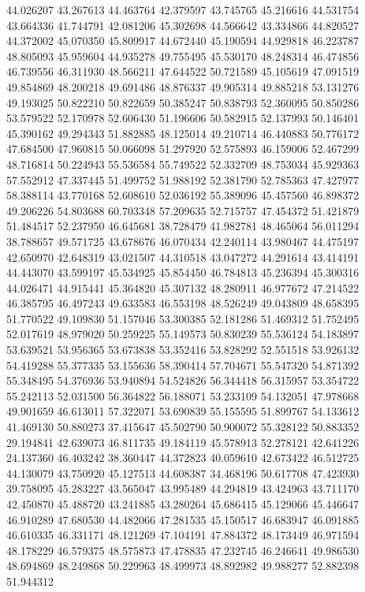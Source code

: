 44.026207
43.267613
44.463764
42.379597
43.745765
45.216616
44.531754
43.664336
41.744791
42.081206
45.302698
44.566642
43.334866
44.820527
44.372002
45.070350
45.809917
44.672440
45.190594
44.929818
46.223787
48.805093
45.959604
44.935278
49.755495
45.530170
48.248314
46.474856
46.739556
46.311930
48.566211
47.644522
50.721589
45.105619
47.091519
49.854869
48.200218
49.691486
48.876337
49.905314
49.885218
53.131276
49.193025
50.822210
50.822659
50.385247
50.838793
52.360095
50.850286
53.579522
52.170978
52.606430
51.196606
50.582915
52.137993
50.146401
45.390162
49.294343
51.882885
48.125014
49.210714
46.440883
50.776172
47.684500
47.960815
50.066098
51.297920
52.575893
46.159006
52.467299
48.716814
50.224943
55.536584
55.749522
52.332709
48.753034
45.929363
57.552912
47.337445
51.499752
51.988192
52.381790
52.785363
47.427977
58.388114
43.770168
52.608610
52.036192
55.389096
45.457560
46.898372
49.206226
54.803688
60.703348
57.209635
52.715757
47.454372
51.421879
51.484517
52.237950
46.645681
38.728479
41.982781
48.465064
56.011294
38.788657
49.571725
43.678676
46.070434
42.240114
43.980467
44.475197
42.650970
42.648319
43.021507
44.310518
43.047272
44.291614
43.414191
44.443070
43.599197
45.534925
45.854450
46.784813
45.236394
45.300316
44.026471
44.915441
45.364820
45.307132
48.280911
46.977672
47.214522
46.385795
46.497243
49.633583
46.553198
48.526249
49.043809
48.658395
51.770522
49.109830
51.157046
53.300385
52.181286
51.469312
51.752495
52.017619
48.979020
50.259225
55.149573
50.830239
55.536124
54.183897
53.639521
53.956365
53.673838
53.352416
53.828292
52.551518
53.926132
54.419288
55.377335
53.155636
58.390414
57.704671
55.547320
54.871392
55.348495
54.376936
53.940894
54.524826
56.344418
56.315957
53.354722
55.242113
52.031500
56.364822
56.188071
53.233109
54.132051
47.978668
49.901659
46.613011
57.322071
53.690839
55.155595
51.899767
54.133612
41.469130
50.880273
37.415647
45.502790
50.900072
55.328122
50.883352
29.194841
42.639073
46.811735
49.184119
45.578913
52.278121
42.641226
24.137360
46.403242
38.360447
44.372823
40.059610
42.673422
46.512725
44.130079
43.750920
45.127513
44.608387
34.468196
50.617708
47.423930
39.758095
45.283227
43.565047
43.995489
44.294819
43.424963
43.711170
42.450870
45.488720
43.241885
43.280264
45.686415
45.129066
45.446647
46.910289
47.680530
44.482066
47.281535
45.150517
46.683947
46.091885
46.610335
46.331171
48.121269
47.104191
47.884372
48.173449
46.971594
48.178229
46.579375
48.575873
47.478835
47.232745
46.246641
49.986530
48.694869
48.249868
50.229963
48.499973
48.892982
49.988277
52.882398
51.944312
